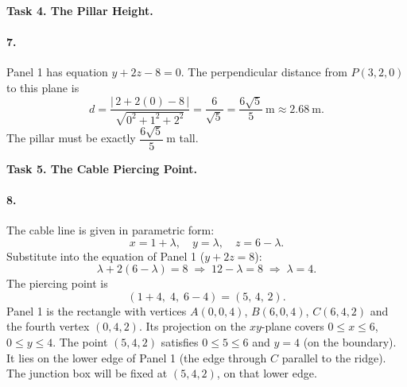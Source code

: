 \documentclass[11pt]{article}
\begin{document}
\textbf{Task 4. The Pillar Height.}
\paragraph{7.} Panel 1 has equation $y + 2z - 8 = 0$. The perpendicular distance from $P(3,2,0)$ to this plane is
\[
d = \frac{|\,2 + 2(0) - 8\,|}{\sqrt{0^2 + 1^2 + 2^2}}
= \frac{6}{\sqrt{5}}
= \frac{6\sqrt{5}}{5}\ \mathrm{m}
\approx 2.68\ \mathrm{m}.
\]
The pillar must be exactly $\dfrac{6\sqrt{5}}{5}\ \mathrm{m}$ tall.

\textbf{Task 5. The Cable Piercing Point.}
\paragraph{8.} The cable line is given in parametric form:
\[
x = 1+\lambda,\quad y = \lambda,\quad z = 6-\lambda.
\]
Substitute into the equation of Panel 1 ($y + 2z = 8$):
\[
\lambda + 2(6-\lambda) = 8
\;\Longrightarrow\;
12 - \lambda = 8
\;\Longrightarrow\;
\lambda = 4.
\]
The piercing point is
\[
(1+4,\; 4,\; 6-4) = (5,\,4,\,2).
\]
Panel 1 is the rectangle with vertices $A(0,0,4)$, $B(6,0,4)$, $C(6,4,2)$ and the fourth vertex $(0,4,2)$. Its projection on the $xy$-plane covers $0 \le x \le 6$, $0 \le y \le 4$. The point $(5,4,2)$ satisfies $0 \le 5 \le 6$ and $y=4$ (on the boundary). It lies on the lower edge of Panel 1 (the edge through $C$ parallel to the ridge). The junction box will be fixed at $(5,4,2)$, on that lower edge.
\end{document}
